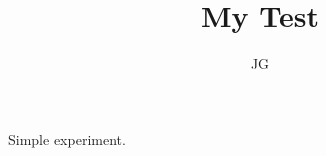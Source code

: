 \documentclass[10pt]{article}
\title{ My Test }
\author{JG}
\begin{document}
\maketitle

Simple experiment.
\end{document}

